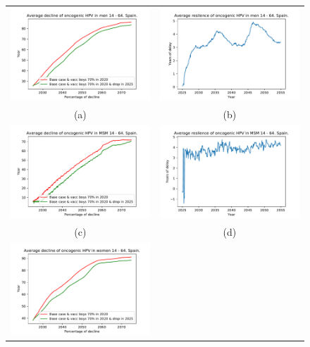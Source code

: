 \begin{figure}[!]
	\centering
	\begin{tabular}{cc}
		\includegraphics[width=0.5\linewidth]{IMGs/11.-Resilencia/2_y_4/decline_onco_hom.pdf}	& 
		\includegraphics[width=0.5\linewidth]{IMGs/11.-Resilencia/2_y_4/resilencia_onco_hom.pdf}  \\ 
		(a)	& (b) \\ 
		\includegraphics[width=0.5\linewidth]{IMGs/11.-Resilencia/2_y_4/decline_onco_MSM.pdf}	& 
		\includegraphics[width=0.5\linewidth]{IMGs/11.-Resilencia/2_y_4/resilencia_onco_MSM.pdf}  \\ 
		(c)	& (d) \\
		\includegraphics[width=0.5\linewidth]{IMGs/11.-Resilencia/2_y_4/decline_onco_muj.pdf}	& 

\end{tabular}
\end{figure}
